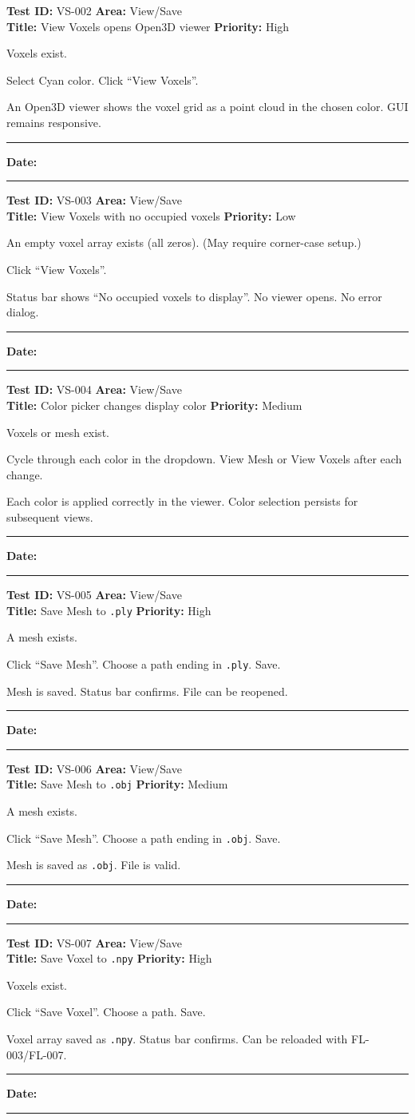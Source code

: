 \documentclass[12pt,a4paper]{article}
\newenvironment{testcase}[4]{%
  \smallskip
  \noindent\textbf{Test ID:} #1 \hfill \textbf{Area:} #2 \\
  \textbf{Title:} #3 \hfill \textbf{Priority:} #4
  \begin{description}[leftmargin=2em,style=nextline]
    \item[\textbf{Preconditions:}]
}{%
    \item[\textbf{Steps:}]
    \item[\textbf{Expected Result:}]
    \item[\textbf{Status:}] \rule{3cm}{0.4pt} \hspace{1em} \textbf{Date:} \rule{3cm}{0.4pt}
    \item[\textbf{Notes:}]
  \end{description}
  \smallskip
}
\begin{document}
\begin{testcase}{VS-002}{View/Save}{View Voxels opens Open3D viewer}{High}
  \item Voxels exist.
  \item Select Cyan color. Click ``View Voxels''.
  \item An Open3D viewer shows the voxel grid as a point cloud in the chosen color. GUI remains responsive.
\end{testcase}

\begin{testcase}{VS-003}{View/Save}{View Voxels with no occupied voxels}{Low}
  \item An empty voxel array exists (all zeros). (May require corner-case setup.)
  \item Click ``View Voxels''.
  \item Status bar shows ``No occupied voxels to display''. No viewer opens. No error dialog.
\end{testcase}

\begin{testcase}{VS-004}{View/Save}{Color picker changes display color}{Medium}
  \item Voxels or mesh exist.
  \item Cycle through each color in the dropdown. View Mesh or View Voxels after each change.
  \item Each color is applied correctly in the viewer. Color selection persists for subsequent views.
\end{testcase}

\begin{testcase}{VS-005}{View/Save}{Save Mesh to \texttt{.ply}}{High}
  \item A mesh exists.
  \item Click ``Save Mesh''. Choose a path ending in \texttt{.ply}. Save.
  \item Mesh is saved. Status bar confirms. File can be reopened.
\end{testcase}

\begin{testcase}{VS-006}{View/Save}{Save Mesh to \texttt{.obj}}{Medium}
  \item A mesh exists.
  \item Click ``Save Mesh''. Choose a path ending in \texttt{.obj}. Save.
  \item Mesh is saved as \texttt{.obj}. File is valid.
\end{testcase}

\begin{testcase}{VS-007}{View/Save}{Save Voxel to \texttt{.npy}}{High}
  \item Voxels exist.
  \item Click ``Save Voxel''. Choose a path. Save.
  \item Voxel array saved as \texttt{.npy}. Status bar confirms. Can be reloaded with FL-003/FL-007.
\end{testcase}
\end{document}
